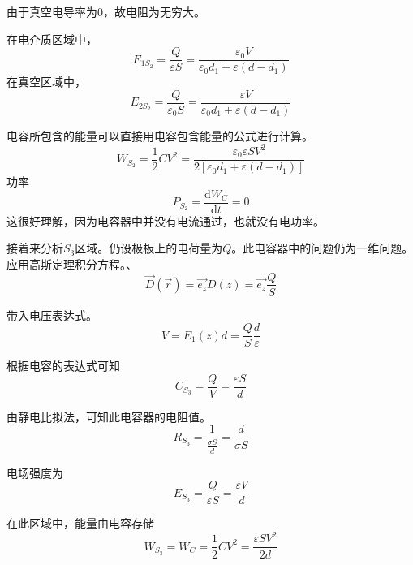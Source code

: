 \documentclass[a4paper]{article}
\begin{document}
		由于真空电导率为0，故电阻为无穷大。\par
		在电介质区域中，
		\begin{equation}
			E_{1S_2} = \frac{Q}{\varepsilon S} = \frac{\varepsilon_0 V}{\varepsilon_0 d_1 + \varepsilon (d-d_1)}
		\end{equation}
		在真空区域中，
		\begin{equation}
			E_{2S_2} = \frac{Q}{\varepsilon_0 S} = \frac{\varepsilon V}{\varepsilon_0 d_1 + \varepsilon (d-d_1)}
		\end{equation}\par
		电容所包含的能量可以直接用电容包含能量的公式进行计算。
		\begin{equation}
			W_{S_2} = \frac{1}{2} C V^2 = \frac{\varepsilon_0 \varepsilon S V^2}{2[\varepsilon_0 d_1 + \varepsilon (d-d_1)]}
		\end{equation}
		功率
		\begin{equation}
			P_{S_2} = \frac{\mathrm{d} W_C}{\mathrm{d} t} = 0
		\end{equation}
		这很好理解，因为电容器中并没有电流通过，也就没有电功率。\par
		接着来分析$S_3$区域。仍设极板上的电荷量为$Q$。此电容器中的问题仍为一维问题。应用高斯定理积分方程。、
		\begin{equation}
			\vec{D}(\vec{r}) = \vec{e_z} D(z) = \vec{e_z} \frac{Q}{S}
		\end{equation}\par
		带入电压表达式。
		\begin{equation}
			V = E_1(z) d = \frac{Q}{S} \frac{d}{\varepsilon}
		\end{equation}\par
		根据电容的表达式可知
		\begin{equation}
			C_{S_3} = \frac{Q}{V} = \frac{\varepsilon S}{d}
		\end{equation}\par
		由静电比拟法，可知此电容器的电阻值。
		\begin{equation}
			R_{S_3} = \frac{1}{\frac{\sigma S}{d}} = \frac{d}{\sigma S}
		\end{equation}\par
		电场强度为
		\begin{equation}
			E_{S_3} = \frac{Q}{\varepsilon S} = \frac{\varepsilon V}{d}
		\end{equation}\par
		在此区域中，能量由电容存储
		\begin{equation}
			W_{S_3} = W_C = \frac{1}{2} C V^2 = \frac{\varepsilon S V^2}{2d}
		\end{equation}
\end{document}
